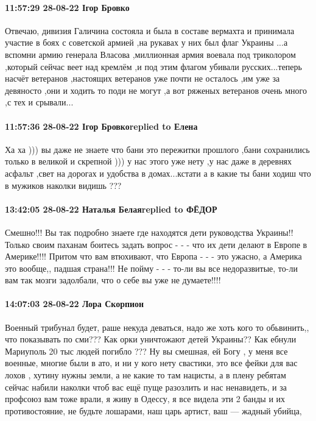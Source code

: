 \paragraph{11:57:29 28-08-22 Ігор Бровко}

Отвечаю, дивизия Галичина состояла и была в составе вермахта и принимала
участие в боях с советской армией ,на рукавах у них был флаг Украины ...а
вспомни армию генерала Власова ,миллионная армия воевала под триколором
,который сейчас веет над кремлём ,и под этим флагом убивали русских...теперь
насчёт ветеранов ,настоящих ветеранов уже почти не осталось ,им уже за
девяносто ,они и ходить то поди не могут ,а вот ряженых ветеранов очень много
,с тех и срывали...

\paragraph{11:57:36 28-08-22 Ігор Бровкоreplied to Елена}

Ха ха ))) вы даже не знаете что бани это пережитки прошлого ,бани сохранились
только в великой и скрепной ))) у нас этого уже нету ,у нас даже в деревнях
асфальт ,свет на дорогах и удобства в домах...кстати а в какие ты бани ходиш
что в мужиков наколки видишь ???

\paragraph{13:42:05 28-08-22 Наталья Белаяreplied to ФЁДОР}

Смешно!!! Вы так подробно знаете где находятся дети руководства Украины!!
Только своим паханам боитесь задать вопрос - - - что их дети делают в Европе в
Америке!!!! Притом что вам втюхивают, что Европа - - - это ужасно, а Америка
это вообще,, падшая страна!!! Не пойму - - - то-ли вы все недоразвитые, то-ли
вам так мозги задолбали, что о себе вы уже не думаете!!!!

\paragraph{14:07:03 28-08-22 Лора Скорпион}

Военный трибунал будет, раше некуда деваться, надо же хоть кого то обьвинить,,
что показывать по сми??? Как орки уничтожают детей Украины?? Как ебнули
Мариуполь 20 тыс людей погибло ??? Ну вы смешная, ей Богу , у меня все военные,
многие были в ато, и ни у кого нету свастики, это все фейки для вас лохов ,
хутину нужны земли, а не какие то там нацисты, а в плену ребятам сейчас набили
наколки чтоб вас ещё пуще разозлить и нас ненавидеть, и за профсоюз вам тоже
врали, я живу в Одессу, я все видела эти 2 банды и их противостояние, не будьте
лошарами, наш царь артист, ваш --- жадный убийца,

